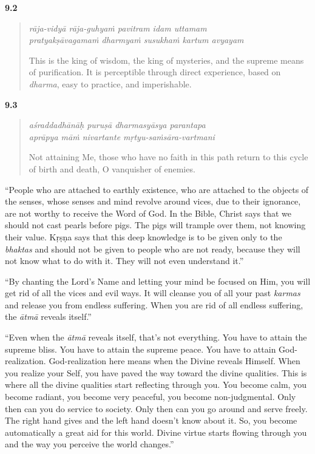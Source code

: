 \par\noindent\textbf{9.2}\par
\begin{verse}
\textit{rāja-vidyā rāja-guhyaṁ pavitram idam uttamam} \\
\textit{pratyakṣāvagamaṁ dharmyaṁ susukhaṁ kartum avyayam}

\noindent This is the king of wisdom, the king of mysteries, and the supreme means of purification. It is perceptible through direct experience, based on \textit{dharma}, easy to practice, and imperishable.
\end{verse}
\par



\par\noindent\textbf{9.3}\par
\begin{verse}
\textit{aśraddadhānāḥ puruṣā dharmasyāsya parantapa} \\
\textit{aprāpya māṁ nivartante mṛtyu-saṁsāra-vartmani}

\noindent Not attaining Me, those who have no faith in this path return to this cycle of birth and death, O vanquisher of enemies.
\end{verse}
\par


\enquote{People who are attached to earthly existence, who are attached to the objects of the senses, whose senses and mind revolve around vices, due to their ignorance, are not worthy to receive the Word of God. In the Bible, Christ says that we should not cast pearls before pigs. The pigs will trample over them, not knowing their value. Kṛṣṇa says that this deep knowledge is to be given only to the \textit{bhaktas} and should not be given to people who are not ready, because they will not know what to do with it. They will not even understand it.}

\enquote{By chanting the Lord’s Name and letting your mind be focused on Him, you will get rid of all the vices and evil ways. It will cleanse you of all your past \textit{karmas} and release you from endless suffering. When you are rid of all endless suffering, the \textit{ātmā} reveals itself.}

\enquote{Even when the \textit{ātmā} reveals itself, that’s not everything. You have to attain the supreme bliss. You have to attain the supreme peace. You have to attain God-realization. God-realization here means when the Divine reveals Himself. When you realize your Self, you have paved the way toward the divine qualities. This is where all the divine qualities start reflecting through you. You become calm, you become radiant, you become very peaceful, you become non-judgmental. Only then can you do service to society. Only then can you go around and serve freely. The right hand gives and the left hand doesn’t know about it. So, you become automatically a great aid for this world. Divine virtue starts flowing through you and the way you perceive the world changes.}

